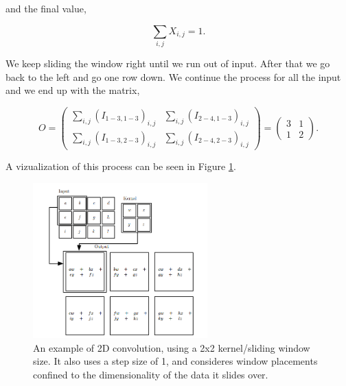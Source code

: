 \begin{description}
        and the final value,

        \begin{equation}
            \sum_{i,j} X_{i,j} = 1.
        \end{equation}

        We keep sliding the window right until we run out of input. After that
        we go back to the left and go one row down. We continue the process for
        all the input and we end up with the matrix,

        \begin{equation}
            O = \begin{pmatrix}
                \sum_{i,j} \left( I_{1-3,1-3} \right)_{i,j} &
                \sum_{i,j} \left( I_{2-4,1-3} \right)_{i,j} \\
                \sum_{i,j} \left( I_{1-3,2-3} \right)_{i,j} &
                \sum_{i,j} \left( I_{2-4,2-3} \right)_{i,j}
            \end{pmatrix} = \begin{pmatrix}
                3 & 1 \\
                1 & 2
            \end{pmatrix}.
        \end{equation}

        A vizualization of this process can be seen in Figure \ref{fig:ConvGen}.

        \begin{figure}
        \centering
        \includegraphics[width=0.6\textwidth]{./pictures/method/ConvGeneral.png}
        \caption{An example of 2D convolution, using a 2x2 kernel/sliding window
            size. It also uses a step size of 1, and consideres window placements
            confined to the dimensionality of the data it slides over.
            \cite{Goodfellow-et-al-2016}}
        \label{fig:ConvGen}
        \end{figure}


\end{description}
